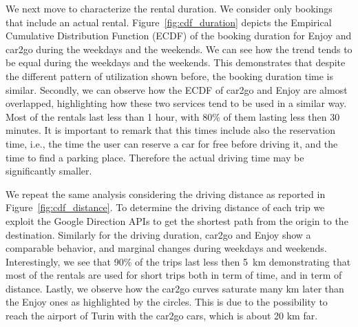 We next move to characterize the rental duration. We consider only bookings that include an actual rental. Figure~\ref{fig:cdf_duration} depicts the Empirical Cumulative Distribution Function (ECDF) of the booking duration for Enjoy and car2go during the weekdays and the weekends. We can see how the trend tends to be equal during the weekdays and the weekends. 
This demonstrates that despite the different pattern of utilization shown before,
the booking duration time is similar. 
Secondly, we can observe how the ECDF of car2go and Enjoy are almost overlapped, highlighting how these two services tend to be used in a similar way. 
{Most of the rentals last less than 1 hour, with 80\% of them lasting less then 30 minutes.}
It is important to remark that this times include also the reservation time, i.e., the time the user can reserve a car for free before driving it, and the time to find a parking place. 
Therefore the actual driving time may be significantly smaller.


{We repeat the same analysis considering the driving distance as reported in Figure~\ref{fig:cdf_distance}.}
To determine the driving distance of each trip we exploit the Google Direction APIs to get the shortest path from the origin to the destination. Similarly 
for the driving duration, car2go and Enjoy show a comparable behavior, and marginal changes during weekdays and weekends. Interestingly, we see that 90\% of the trips last less then 5~km demonstrating that most of the rentals are used for short trips both in term of time, and in term of distance. Lastly, we observe how the car2go curves saturate many km later than the Enjoy ones as highlighted by the circles. This is due to the possibility to reach the airport of Turin with the car2go cars, which is about 20 km far. 




